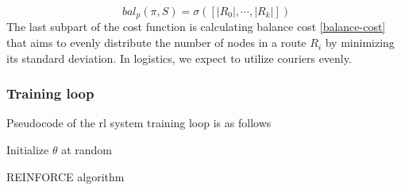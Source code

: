         \begin{equation}\label{balance-cost}
            bal_p(\pi, S) = \sigma([|R_0|, \cdots, |R_k|])
        \end{equation}
        The last subpart of the cost function is calculating balance cost \ref{balance-cost} that aims to evenly distribute the number of nodes in a route $R_i$ by minimizing its standard deviation. In logistics, we expect to utilize couriers evenly.
        
        \subsubsection{Training loop}\label{vrptw-loop}
        
        Pseudocode of the \gls{rl} system training loop is as follows
        
        \begin{algorithm}[H]
            
            Initialize $\theta$ at random\;
         \caption{REINFORCE algorithm}
        \end{algorithm}
        
